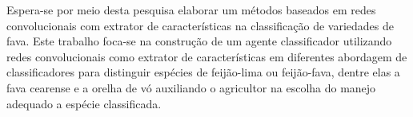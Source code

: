 Espera-se por meio desta pesquisa elaborar um métodos baseados em redes convolucionais com extrator de características na classificação de variedades de fava. Este trabalho foca-se na construção de um agente classificador utilizando redes convolucionais como extrator de características em diferentes abordagem de classificadores para distinguir espécies de feijão-lima ou feijão-fava, dentre elas a fava cearense e a orelha de vó auxiliando o agricultor na escolha do manejo adequado a espécie classificada.


 \label{sec:introducao}